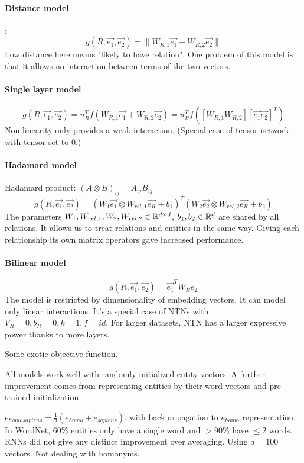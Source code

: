 \paragraph{Distance model}: $$g(R,\vec{e_1},\vec{e_2})=\|W_{R,1} \vec{e_1} -
W_{R,2} \vec{e_2}\|$$
Low distance here means "likely to have relation". One problem of this model
is that it allows no interaction between terms of the two vectors.

\paragraph{Single layer model} $$g(R,\vec{e_1},\vec{e_2})=u_R^T
f(W_{R,1}\vec{e_1} + W_{R,2}\vec{e_2})=u_R^T f([W_{R,1}
W_{R,2}] [\vec{e_1} \vec{e_2}]^T)$$
Non-linearity only provides a weak interaction.
(Special case of tensor network with tensor set to 0.)

\paragraph{Hadamard model}
Hadamard product: $(A\otimes B)_{ij}=A_{ij}B_{ij}$
$$g(R,\vec{e_1},\vec{e_2})=(W_1 \vec{e_1}\otimes W_{rel,1}\vec{e_R}+b_1)^T (W_2
\vec{e_2}\otimes W_{rel,2}\vec{e_R}+b_2)$$
The parameters $W_1,W_{rel,1},W_2,W_{rel,2}\in\mathbb{R}^{d\times d}$, $b_1,b_2\in\mathbb{R}^d$
are shared by all relations. It allows us to treat relations and entities in the
same way. Giving each relationship its own matrix operators gave increased
performance.

\paragraph{Bilinear model}
$$g(R,\vec{e_1},\vec{e_2})=\vec{e_1}^T W_R e_2$$
The model is restricted by dimensionality of embedding vectors. It can model
only linear interactions. It's a special case of NTNs with
$V_R=0,b_R=0,k=1,f=id$. For larger datasets, NTN has a larger expressive power
thanks to more layers.

Some exotic objective function.

All models work well with randomly initialized entity vectors.
A further improvement comes from representing entities by their word vectors
and pre-trained initialization.

$e_{homo sapiens} = \frac{1}{2}(e_{homo} + e_{sapiens})$, with backpropagation
to $e_{homo}$ representation.
In WordNet, 60\% entities only have a single word and $>90\%$ have $\leq 2$
words. RNNs did not give any distinct improvement over averaging.
Using $d=100$ vectors. Not dealing with homonyms.

